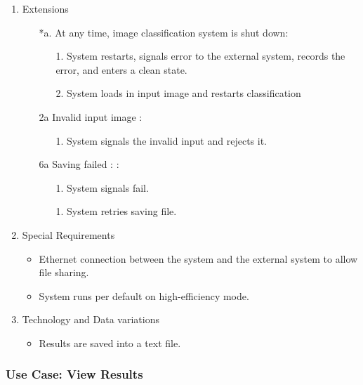 \documentclass[parskip=full]{scrartcl}
\begin{document}
\begin{enumerate}
\pagebreak

	\item Extensions
	\begin{itemize} [nosep]
		\item[*a.] At any time, image classification system is shut down:
		\begin{itemize} [nosep]
			\item[1.] System restarts, signals error to the external system, records the error, and enters a clean state.
			\item[2.] System loads in input image and restarts classification
		\end{itemize}
		\item[2a] Invalid input image :
		\begin{itemize} [nosep]
			\item[1.] System signals the invalid input and rejects it.
		\end{itemize}
		\item[6a] Saving failed : :
		\begin{itemize} [nosep]
			\item[1.] System signals fail.
			\item[1.] System retries saving file.
		\end{itemize}				
	\end{itemize}
	\item Special Requirements
	\begin{itemize} [nosep]
		\item Ethernet connection between the system and the external system to allow file sharing.
		\item System runs per default on high-efficiency mode.
	\end{itemize}
	\item Technology and Data variations
	\begin{itemize} [nosep]
		\item Results are saved into a text file.
	\end{itemize}
	
\end{enumerate}

\pagebreak

\subsubsection {Use Case: View Results }
\end{document}
